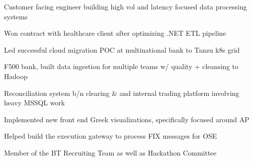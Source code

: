 \documentclass[]{deedy-resume}
\begin{document}
\begin{minipage}[t]{0.66\textwidth}
\begin{tightitemize}
    \item Customer facing engineer building high vol and latency focused data processing systems
    \item Won contract with healthcare client after optimizing .NET ETL pipeline
    \item Led successful cloud migration POC at multinational bank to Tanzu k8s grid
    \item F500 bank, built data ingestion for multiple teams w/ quality + cleansing to Hadoop
        
\end{tightitemize}
\sectionspace

\begin{tightitemize}
\item Reconciliation system b/n clearing \& and internal trading platform involving heavy MSSQL work
\item Implemented new front end Greek visualizations, specifically focused around AP
\item Helped build the execution gateway to process FIX messages for OSE 
\item Member of the BT Recruiting Team as well as Hackathon Committee
\end{tightitemize}
\sectionspace



\end{minipage}
\end{document}
